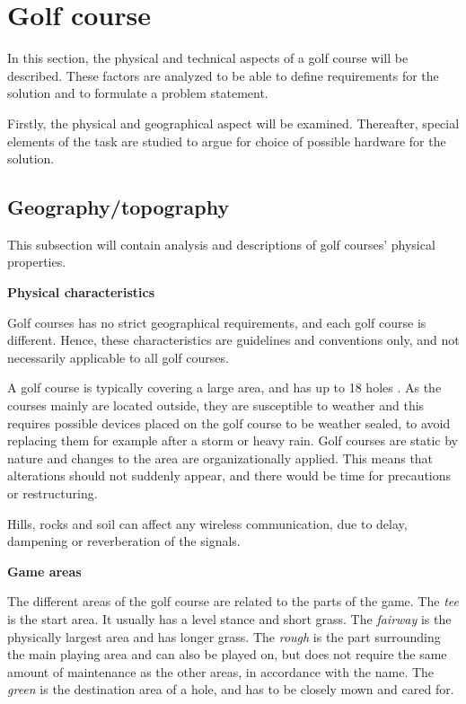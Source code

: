 \section{Golf course}
In this section, the physical and technical aspects of a golf course will be described. These factors are analyzed to be able to define requirements for the solution and to formulate a problem statement.

Firstly, the physical and geographical aspect will be examined. Thereafter, special elements of the task are studied to argue for choice of possible hardware for the solution. 

\subsection{Geography/topography}
This subsection will contain analysis and descriptions of golf courses' physical properties.

\textbf{Physical characteristics}

Golf courses has no strict geographical requirements, and each golf course is different. Hence, these characteristics are guidelines and conventions only, and not necessarily applicable to all golf courses. 

A golf course is typically covering a large area, and has up to 18 holes \cite{golfCourse}. As the courses mainly are located outside, they are susceptible to weather and this requires possible devices placed on the golf course to be weather sealed, to avoid replacing them for example after a storm or heavy rain. Golf courses are static by nature and changes to the area are organizationally applied. This means that alterations should not suddenly appear, and there would be time for precautions or restructuring.

Hills, rocks and soil can affect any wireless communication, due to delay, dampening or reverberation of the signals.

\textbf{Game areas}

The different areas of the golf course are related to the parts of the game. The \textit{tee} is the start area. It usually has a level stance and short grass. The \textit{fairway} is the physically largest area and has longer grass. The \textit{rough} is the part surrounding the main playing area and can also be played on, but does not require the same amount of maintenance as the other areas, in accordance with the name. The \textit{green} is the destination area of a hole, and has to be closely mown and cared for. 

